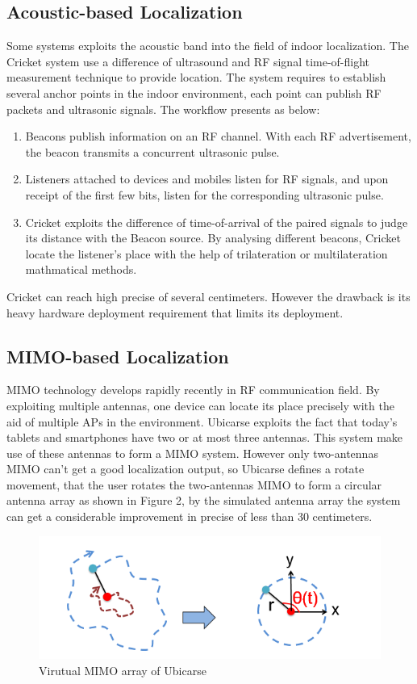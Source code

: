 \documentclass[a4paper, 11pt]{article} %
\begin{document}
\subsection{Acoustic-based Localization \cite{Cricket04}}
Some systems exploits the acoustic band into the field of indoor localization. The Cricket system \cite{Cricket04} use a difference of ultrasound and RF signal time-of-flight measurement technique to provide location. The system requires to establish several anchor points in the indoor environment, each point can publish RF packets and ultrasonic signals. The workflow presents as below: 

\begin{enumerate}
	\item Beacons publish information on an RF channel. With each RF advertisement, the beacon transmits a concurrent ultrasonic pulse.
	\item Listeners attached to devices and mobiles listen for RF signals, and upon receipt of the first few bits, listen for the corresponding ultrasonic pulse.
	\item Cricket exploits the difference of time-of-arrival of the paired signals to judge its distance with the Beacon source. By analysing different beacons, Cricket locate the listener's place with the help of trilateration or multilateration mathmatical methods.
\end{enumerate}

Cricket can reach high precise of several centimeters. However the drawback is its heavy hardware deployment requirement that limits its deployment.


\subsection{MIMO-based Localization \cite{Ubicarse14}}
MIMO technology develops rapidly recently in RF communication field. By exploiting multiple antennas, one device can locate its place precisely with the aid of multiple APs in the environment. Ubicarse exploits the fact that today's tablets and smartphones have two or at most three antennas. This system make use of these antennas to form a MIMO system. However only two-antennas MIMO can't get a good localization output, so Ubicarse defines a rotate movement, that the user rotates the two-antennas MIMO to form a circular antenna array as shown in Figure 2, by the simulated antenna array the system can get a considerable improvement in precise of less than 30 centimeters.
\begin{figure}[h]
	\centering 
	\includegraphics[width=0.8\linewidth]{Figure4.png}
	\caption{Virutual MIMO array of Ubicarse}
	\label{fig:subfig}
\end{figure}
\end{document}
